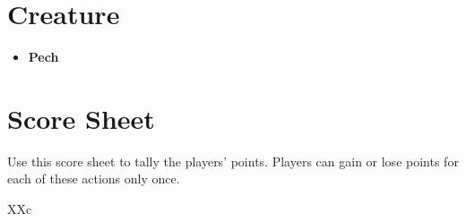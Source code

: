 \documentclass[10pt,a4paper,twoside,bg=print,twocolumn,openany,nodeprecatedcode]{dndbook}
\begin{document}
\section{Creature}

\begin{itemize}
\item \textbf{Pech}
\end{itemize}

\section{Score Sheet}
Use this score sheet to tally the players' points. Players can gain or lose points for each of these actions only once.

\begin{DndTable}[header=Points by Area]{XXc}


\end{DndTable}
\end{document}
